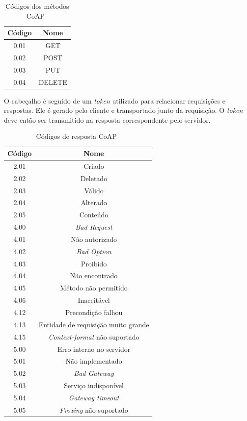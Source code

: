 \begin{table}[!ht]
	\centering\tiny{
	\caption{Códigos dos métodos CoAP~\cite{shelby2014constrained} \label{tab:coap_met}}
	\begin{tabular}{|c|c|}
		\hline
		\textbf{Código} & \textbf{Nome} \\ \hline
		0.01       &      GET      \\ \hline
		0.02       &     POST      \\ \hline
		0.03       &      PUT      \\ \hline
		0.04       &    DELETE     \\ \hline
	\end{tabular}
}
\end{table}

O cabeçalho é seguido de um \textit{token} utilizado para relacionar requisições e respostas. Ele é gerado pelo cliente e transportado junto da requisição. O \textit{token} deve então ser transmitido na resposta correspondente pelo servidor.

\begin{table}
	\centering\tiny{
	\caption{Códigos de resposta CoAP~\cite{shelby2014constrained}  \label{tab:coap_rep}}
	\begin{tabular}{|c|c|}
		\hline 
		\textbf{Código} & \textbf{Nome} \\ 
		\hline 
		2.01 & Criado \\ 
		\hline 
		2.02 & Deletado \\ 
		\hline 
		2.03 & Válido \\ 
		\hline 
		2.04 & Alterado \\ 
		\hline 
		2.05 & Conteúdo \\ 
		\hline 
		4.00 & \textit{Bad Request} \\ 
		\hline 
		4.01 & Não autorizado \\ 
		\hline 
		4.02 & \textit{Bad Option} \\ 
		\hline 
		4.03 & Proibido \\ 
		\hline 
		4.04 & Não encontrado \\ 
		\hline 
		4.05 & Método não permitido \\ 
		\hline 
		4.06 & Inaceitável \\ 
		\hline 
		4.12 & Precondição falhou \\ 
		\hline 
		4.13 & Entidade de requisição muito grande \\ 
		\hline 
		4.15 & \textit{Context-format} não suportado \\ 
		\hline 
		5.00 & Erro interno no servidor \\ 
		\hline 
		5.01 & Não implementado \\ 
		\hline 
		5.02 & \textit{Bad Gateway} \\ 
		\hline 
		5.03 & Serviço indisponível \\ 
		\hline 
		5.04 & \textit{Gateway timeout} \\ 
		\hline 
		5.05 & \textit{Proxing} não suportado \\ 
		\hline 
	\end{tabular} 
}
\end{table}
 \FloatBarrier
 
